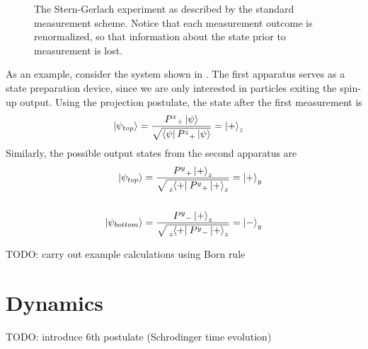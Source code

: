 \begin{figure}
\centering\CaptionFontSize
{}
\caption[Insert an abbreviated caption here to show in the List of Figures]
{The Stern-Gerlach experiment as described by the standard measurement scheme. Notice that each measurement
outcome is renormalized, so that information about the state prior to measurement is lost.}
\label{Figure:Measurement:Renormalizing}
\end{figure}

As an example, consider the system shown in . The first apparatus serves as a state preparation device, since we are only interested in particles exiting the spin-up output. Using the projection postulate, the state after the first measurement is
\begin{align}
    \ket{\psi_{top}} &= \frac{{P^z}_+\ket{\psi}}{\sqrt{\bra{\psi}{P^z}_+\ket{\psi}}} = \ket{+}_z
\end{align}
Similarly, the possible output states from the second apparatus are
\begin{align}
    \ket{\psi_{top}} &= \frac{{P^y}_+\ket{+}_z}{\sqrt{\tensor[_z]{\bra{+}}{}{P^y}_+\ket{+}_z}} = \ket{+}_y \\ \\
    \ket{\psi_{bottom}} &= \frac{{P^y}_-\ket{+}_z}{\sqrt{\tensor[_z]{\bra{+}}{}{P^y}_-\ket{+}_z}} = \ket{-}_y
\end{align}

TODO: carry out example calculations using Born rule

\section{Dynamics}
TODO: introduce 6th postulate (Schrodinger time evolution)

